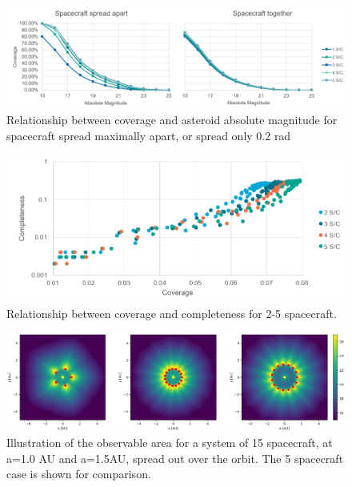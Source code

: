 \begin{figure}[htbp]
 \centering
 \includegraphics[width=1.0\textwidth]{img/spread_coverage.png}
 \caption{Relationship between coverage and asteroid absolute magnitude for spacecraft spread maximally apart, or spread only 0.2 rad}
 \label{fig:spread_coverage}
\end{figure}

\begin{figure}[htbp]
 \centering
 \includegraphics[width=1.0\textwidth]{img/coverage_completeness.png}
 \caption{Relationship between coverage and completeness for 2-5 spacecraft.}
 \label{fig:coverage_completeness}
\end{figure}

\begin{figure}[htbp]
 \centering
 \includegraphics[width=1.0\textwidth]{img/coverage_high_n.png}
 \caption{Illustration of the observable area for a system of 15 spacecraft, at a=1.0 AU and a=1.5AU, spread out over the orbit. The 5 spacecraft case is shown for comparison.}
 \label{fig:coverage_high_n}
\end{figure}

